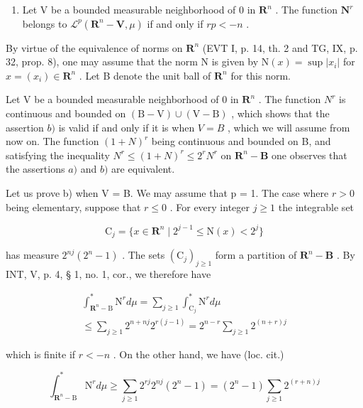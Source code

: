 \begin{enumerate}
\def\labelenumi{\alph{enumi})}
\setcounter{enumi}{1}
\tightlist
\item
  Let V be a bounded measurable neighborhood of 0 in \(\mathbf{R}^{n}\) . The function \(\mathbf{N}^{r}\) belongs to \(\mathcal{L}^{p}(\mathbf{R}^{n}-\mathbf{V},\mu)\) if and only if \(rp<-n\) .
\end{enumerate}

By virtue of the equivalence of norms on \(\mathbf{R}^{n}\) (EVT I, p. 14, th. 2 and TG, IX, p. 32, prop. 8), one may assume that the norm N is given by \(\mathrm{N}(x)=\sup|x_{i}|\) for \(x=(x_{i})\in\mathbf{R}^{n}\) . Let B denote the unit ball of \(\mathbf{R}^{n}\) for this norm.

Let V be a bounded measurable neighborhood of 0 in \(\mathbf{R}^n\) . The function \(N^r\) is continuous and bounded on \((\mathrm{B - V})\cup (\mathrm{V - B})\) , which shows that the assertion \(b)\) is valid if and only if it is when \(V = B\) , which we will assume from now on. The function \((1 + N)^r\) being continuous and bounded on B, and satisfying the inequality \(N^r\leqslant (1 + N)^r\leqslant 2^r N^r\) on \(\mathbf{R}^n -\mathbf{B}\) one observes that the assertions \(a)\) and \(b)\) are equivalent.

Let us prove b) when V = B. We may assume that p = 1. The case where \(r > 0\) being elementary, suppose that \(r \leqslant 0\) . For every integer \(j \geqslant 1\) the integrable set

\[
\mathrm{C} _ {j} = \{x \in \mathbf {R} ^ {n} \mid 2 ^ {j - 1} \leqslant \mathrm{N} (x) <   2 ^ {j} \}
\]

has measure \(2^{nj}(2^n - 1)\) . The sets \((\mathrm{C}_j)_{j \geqslant 1}\) form a partition of \(\mathbf{R}^n - \mathbf{B}\) . By INT, V, p. 4, § 1, no. 1, cor., we therefore have

\[
\begin{array}{c} \int_ {\mathbf {R} ^ {n} - \mathrm{B}} ^ {*} \mathrm{N} ^ {r} d \mu = \sum_ {j \geqslant 1} \int_ {\mathrm{C} _ {j}} ^ {*} \mathrm{N} ^ {r} d \mu \\ \leqslant \sum_ {j \geqslant 1} 2 ^ {n + n j} 2 ^ {r (j - 1)} = 2 ^ {n - r} \sum_ {j \geqslant 1} 2 ^ {(n + r) j} \end{array}
\]

which is finite if \(r < -n\) . On the other hand, we have (loc. cit.)

\[
\int_ {\mathbf {R} ^ {n} - \mathrm{B}} ^ {*} \mathrm{N} ^ {r} d \mu \geqslant \sum_ {j \geqslant 1} 2 ^ {r j} 2 ^ {n j} (2 ^ {n} - 1) = (2 ^ {n} - 1) \sum_ {j \geqslant 1} 2 ^ {(r + n) j}
\]


